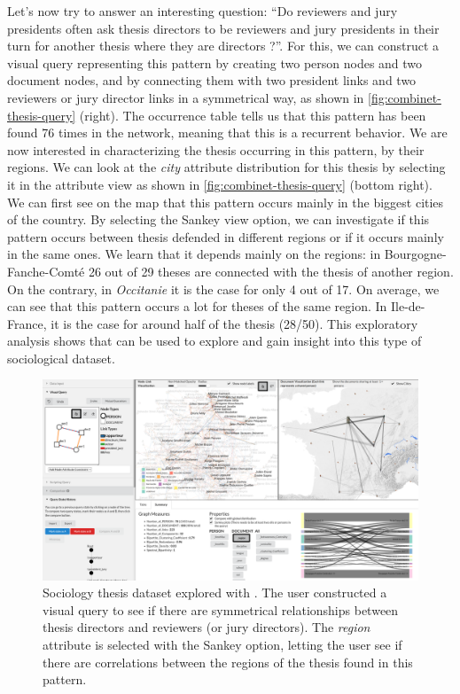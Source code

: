 Let's now try to answer an interesting question: ``Do reviewers and jury presidents often ask thesis directors to be reviewers and jury presidents in their turn for another thesis where they are directors ?''.
For this, we can construct a visual query representing this pattern by creating two person nodes and two document nodes, and by connecting them with two president links and two reviewers or jury director links in a symmetrical way, as shown in \autoref{fig:combinet-thesis-query} (right).
The occurrence table tells us that this pattern has been found 76 times in the network, meaning that this is a recurrent behavior.
We are now interested in characterizing the thesis occurring in this pattern, by their regions.
We can look at the \textit{city} attribute distribution for this thesis by selecting it in the attribute view as shown in \autoref{fig:combinet-thesis-query} (bottom right).
We can first see on the map that this pattern occurs mainly in the biggest cities of the country.
By selecting the Sankey view option, we can investigate if this pattern occurs between thesis defended in different regions or if it occurs mainly in the same ones.
We learn that it depends mainly on the regions: in Bourgogne-Fanche-Comté 26 out of 29 theses are connected with the thesis of another region.
On the contrary, in \textit{Occitanie} it is the case for only 4 out of 17.
On average, we can see that this pattern occurs a lot for theses of the same region.
In Ile-de-France, it is the case for around half of the thesis (28/50).
This exploratory analysis shows that \name can be used to explore and gain insight into this type of sociological dataset.

\begin{figure}[!ht]
    \centering
    \includegraphics[width=1\textwidth]{static/figures/ComBiNet/Thesis-query01-and-results}
    \caption{Sociology thesis dataset explored with \name. The user constructed a visual query to see if there are symmetrical relationships between thesis directors and reviewers (or jury directors). The \textit{region} attribute is selected with the Sankey option, letting the user see if there are correlations between the regions of the thesis found in this pattern.  }\label{fig:combinet-thesis-query}
\end{figure}

